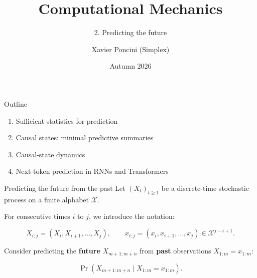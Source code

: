 \documentclass[aspectratio=169,12pt,t]{beamer}
\title{Computational Mechanics}
\subtitle{2. Predicting the future}
\institute{ILIAD Intensive}
\date{Autumn 2026}
\author{Xavier Poncini (Simplex)}
\begin{document}
\iliadtitle

\begin{frame}{Outline}
  \vspace{5mm}
  \begin{enumerate}
    \setlength{\itemsep}{4mm}
    \item Sufficient statistics for prediction
    \item Causal states: minimal predictive summaries
    \item Causal-state dynamics
    \item Next-token prediction in RNNs and Transformers
  \end{enumerate}
\end{frame}

\begin{frame}{Predicting the future from the past}
  Let $(X_t)_{t\geq 1}$ be a discrete-time stochastic process on a finite alphabet $\mathcal{X}$.

  \vspace{2mm}

  For consecutive times $i$ to $j$, we introduce the notation:

  \[
    X_{i:j}=(X_i,X_{i+1},\ldots,X_j),
    \qquad
    x_{i:j}=(x_i,x_{i+1},\ldots,x_j)\in\mathcal{X}^{j-i+1}.
  \]

  Consider predicting the \textbf{future} $X_{m+1:m+n}$
  from \textbf{past} observations $X_{1:m}=x_{1:m}$:

  \[
    \Pr\!\left(X_{m+1:m+n}\mid X_{1:m}=x_{1:m}\right).
  \]

  {\centering
    \setlength{\fboxsep}{3mm}
    \setlength{\fboxrule}{0.5pt}
    \par}
\end{frame}
\end{document}
